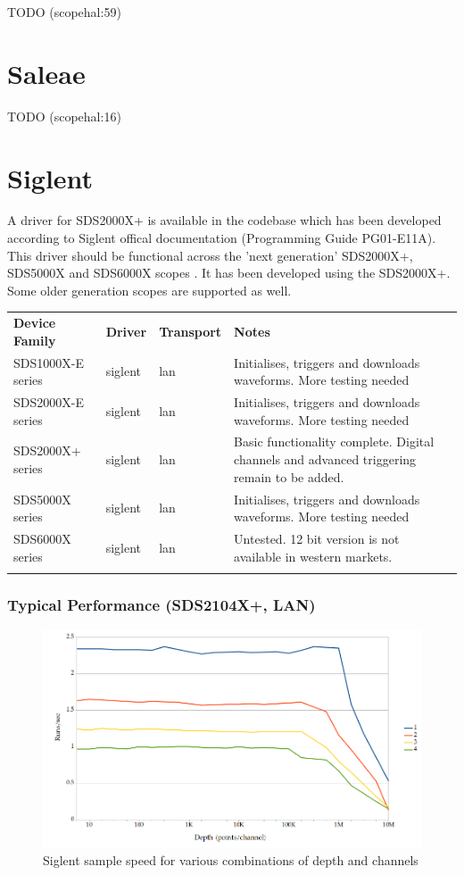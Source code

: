 TODO (scopehal:59)

\section{Saleae}
TODO (scopehal:16)

\section{Siglent}

A driver for SDS2000X+ is available in the codebase which has been developed according to Siglent offical documentation
(Programming Guide PG01-E11A). This driver should be functional across the 'next generation' SDS2000X+, SDS5000X and
SDS6000X scopes . It has been developed using the SDS2000X+. Some older generation scopes are supported as well.

\begin{tabularx}{16cm}{lllX}
\thickhline
\textbf{Device Family} & \textbf{Driver} & \textbf{Transport} & \textbf{Notes} \\
\thickhline
SDS1000X-E series & siglent & lan & Initialises, triggers and downloads waveforms. More testing needed \\
\thickhline
SDS2000X-E series & siglent & lan & Initialises, triggers and downloads waveforms. More testing needed \\
\thickhline
SDS2000X+ series & siglent & lan & Basic functionality complete. Digital channels and advanced triggering remain to be added. \\
\thickhline
SDS5000X series & siglent & lan & Initialises, triggers and downloads waveforms. More testing needed \\
\thickhline
SDS6000X series & siglent & lan & Untested. 12 bit version is not available in western markets. \\
\thickhline
\end{tabularx}

\subsubsection{Typical Performance (SDS2104X+, LAN)}

\begin{figure}[h]
\centering
\includegraphics[width=16cm]{images/siglent-samples.png}
\caption{Siglent sample speed for various combinations of depth and channels}
\label{siglent_sample}
\end{figure}



